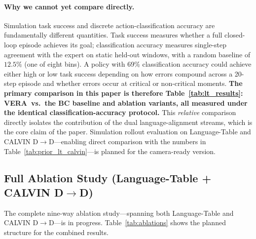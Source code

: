 \documentclass{article}
\newcommand{\modelname}{\textsc{VERA}\xspace}
\begin{document}
\paragraph{Why we cannot yet compare directly.}
Simulation task success and discrete action-classification accuracy are
fundamentally different quantities.
Task success measures whether a full closed-loop episode achieves its goal;
classification accuracy measures single-step agreement with the expert on
static held-out windows, with a random baseline of $12.5\%$ (one of eight bins).
A policy with 69\% classification accuracy could achieve either high or low
task success depending on how errors compound across a 20-step episode and
whether errors occur at critical or non-critical moments.
\textbf{The primary comparison in this paper is therefore Table~\ref{tab:lt_results}:
\modelname\ vs.\ the BC baseline and ablation variants, all measured under
the identical classification-accuracy protocol.}
This \emph{relative} comparison directly isolates the contribution of the
dual language-alignment streams, which is the core claim of the paper.
Simulation rollout evaluation on Language-Table and CALVIN D$\to$D---enabling
direct comparison with the numbers in Table~\ref{tab:prior_lt_calvin}---is
planned for the camera-ready version.

\subsection{Full Ablation Study (Language-Table + CALVIN D$\to$D)}
\label{sec:ablation_extended}

The complete nine-way ablation study—spanning both Language-Table and
CALVIN D$\to$D—is in progress.
Table~\ref{tab:ablations} shows the planned structure for the combined results.
\end{document}
